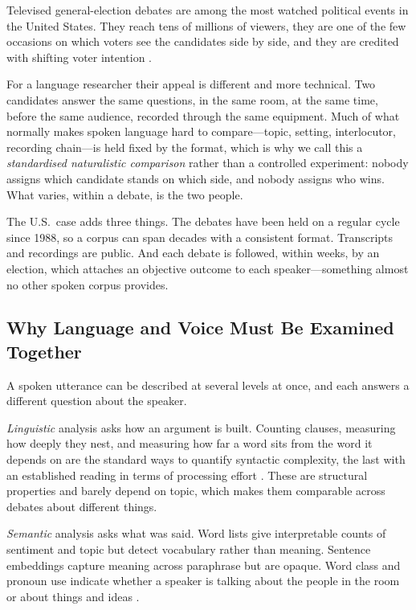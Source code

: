 \documentclass[journal]{IEEEtran}
\begin{document}
Televised general-election debates are among the most watched political
events in the United States. They reach tens of millions of viewers, they are
one of the few occasions on which voters see the candidates side by side, and
they are credited with shifting voter intention \cite{benoit2014debates}.

For a language researcher their appeal is different and more technical. Two
candidates answer the same questions, in the same room, at the same time,
before the same audience, recorded through the same equipment. Much of what
normally makes spoken language hard to compare---topic, setting, interlocutor,
recording chain---is held fixed by the format, which is why we call this a
\emph{standardised naturalistic comparison} rather than a controlled
experiment: nobody assigns which candidate stands on which side, and nobody
assigns who wins. What varies, within a debate, is the two people.

The U.S.\ case adds three things. The debates have been held on a regular
cycle since 1988, so a corpus can span decades with a consistent format.
Transcripts and recordings are public. And each debate is followed, within
weeks, by an election, which attaches an objective outcome to each
speaker---something almost no other spoken corpus provides.

\subsection{Why Language and Voice Must Be Examined Together}
\label{sec:intro:roles}

A spoken utterance can be described at several levels at once, and each
answers a different question about the speaker.

\emph{Linguistic} analysis asks how an argument is built. Counting clauses,
measuring how deeply they nest, and measuring how far a word sits from the
word it depends on are the standard ways to quantify syntactic complexity, the
last with an established reading in terms of processing effort
\cite{gibson1998linguistic}. These are structural properties and barely depend
on topic, which makes them comparable across debates about different things.

\emph{Semantic} analysis asks what was said. Word lists give interpretable
counts of sentiment and topic but detect vocabulary rather than meaning.
Sentence embeddings capture meaning across paraphrase but are opaque. Word
class and pronoun use indicate whether a speaker is talking about the people
in the room or about things and ideas \cite{pennebaker2014small}.
\end{document}
